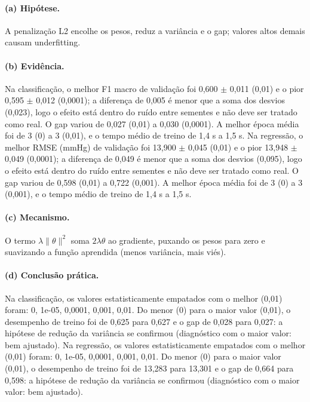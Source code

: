 \documentclass[11pt,a4paper]{article}
\begin{document}
\paragraph{(a) Hipótese.} A penalização L2 encolhe os pesos, reduz a variância e o gap; valores altos demais causam underfitting.

\paragraph{(b) Evidência.} Na classificação, o melhor F1 macro de validação foi 0,600 $\pm$ 0,011 (0,01) e o pior 0,595 $\pm$ 0,012 (0,0001); a diferença de 0,005 é menor que a soma dos desvios (0,023), logo o efeito está dentro do ruído entre sementes e não deve ser tratado como real. O gap variou de 0,027 (0,01) a 0,030 (0,0001). A melhor época média foi de 3 (0) a 3 (0,01), e o tempo médio de treino de 1,4 s a 1,5 s. Na regressão, o melhor RMSE (mmHg) de validação foi 13,900 $\pm$ 0,045 (0,01) e o pior 13,948 $\pm$ 0,049 (0,0001); a diferença de 0,049 é menor que a soma dos desvios (0,095), logo o efeito está dentro do ruído entre sementes e não deve ser tratado como real. O gap variou de 0,598 (0,01) a 0,722 (0,001). A melhor época média foi de 3 (0) a 3 (0,001), e o tempo médio de treino de 1,4 s a 1,5 s.

\paragraph{(c) Mecanismo.} O termo $\lambda\lVert\theta\rVert^2$ soma $2\lambda\theta$ ao gradiente, puxando os pesos para zero e suavizando a função aprendida (menos variância, mais viés).

\paragraph{(d) Conclusão prática.} Na classificação, os valores estatisticamente empatados com o melhor (0,01) foram: 0, 1e-05, 0,0001, 0,001, 0,01. Do menor (0) para o maior valor (0,01), o desempenho de treino foi de 0,625 para 0,627 e o gap de 0,028 para 0,027: a hipótese de redução da variância se confirmou (diagnóstico com o maior valor: bem ajustado). Na regressão, os valores estatisticamente empatados com o melhor (0,01) foram: 0, 1e-05, 0,0001, 0,001, 0,01. Do menor (0) para o maior valor (0,01), o desempenho de treino foi de 13,283 para 13,301 e o gap de 0,664 para 0,598: a hipótese de redução da variância se confirmou (diagnóstico com o maior valor: bem ajustado).
\end{document}
